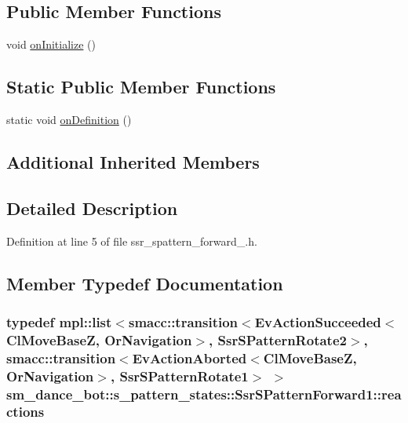 \subsection*{Public Member Functions}
\begin{DoxyCompactItemize}
\item 
void \hyperlink{structsm__dance__bot_1_1s__pattern__states_1_1SsrSPatternForward1_a5cd2009ce0865f2e84f4ddff679a9a98}{on\+Initialize} ()
\end{DoxyCompactItemize}
\subsection*{Static Public Member Functions}
\begin{DoxyCompactItemize}
\item 
static void \hyperlink{structsm__dance__bot_1_1s__pattern__states_1_1SsrSPatternForward1_a946f32a88d7714cdbb6e13b8bd910d29}{on\+Definition} ()
\end{DoxyCompactItemize}
\subsection*{Additional Inherited Members}


\subsection{Detailed Description}


Definition at line 5 of file ssr\+\_\+spattern\+\_\+forward\+\_.\+h.



\subsection{Member Typedef Documentation}
\subsubsection[{\texorpdfstring{reactions}{reactions}}]{\setlength{\rightskip}{0pt plus 5cm}typedef mpl\+::list$<${\bf smacc\+::transition}$<$Ev\+Action\+Succeeded$<${\bf Cl\+Move\+BaseZ}, {\bf Or\+Navigation}$>$, {\bf Ssr\+S\+Pattern\+Rotate2}$>$, {\bf smacc\+::transition}$<$Ev\+Action\+Aborted$<${\bf Cl\+Move\+BaseZ}, {\bf Or\+Navigation}$>$, {\bf Ssr\+S\+Pattern\+Rotate1}$>$ $>$ {\bf sm\+\_\+dance\+\_\+bot\+::s\+\_\+pattern\+\_\+states\+::\+Ssr\+S\+Pattern\+Forward1\+::reactions}}\hypertarget{structsm__dance__bot_1_1s__pattern__states_1_1SsrSPatternForward1_a803c45f7d5d07bed8cb0907237e5dc27}{}\label{structsm__dance__bot_1_1s__pattern__states_1_1SsrSPatternForward1_a803c45f7d5d07bed8cb0907237e5dc27}


